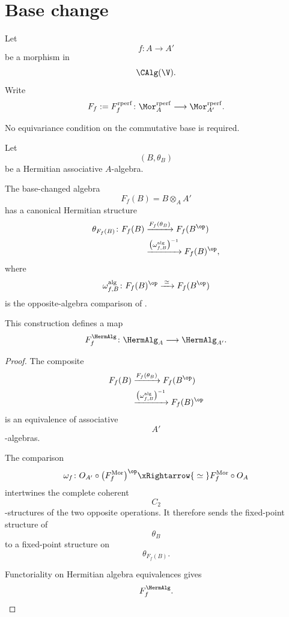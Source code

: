\section{Base change}
\label{sec:equivariant-base-change}

Let
\[
    f
    \colon
    A
    \longrightarrow
    A'
\]
be a morphism in
\[
    \CAlg(\V).
\]
Write
\[
    F_f
    :=
    F_f^{\mathrm{rperf}}
    \colon
    \Mor_A^{\mathrm{rperf}}
    \longrightarrow
    \Mor_{A'}^{\mathrm{rperf}}.
\]

No equivariance condition on the commutative base is required.

\begin{proposition}
\label{prop:base-change-hermitian-algebra}
Let
\[
    (B,\theta_B)
\]
be a Hermitian associative $A$-algebra.

The base-changed algebra
\[
    F_f(B)
    =
    B\otimes_AA'
\]
has a canonical Hermitian structure
\[
\begin{aligned}
    \theta_{F_f(B)}
    \colon
    F_f(B)
    &\xrightarrow{
        F_f(\theta_B)
    }
    F_f(B^{\op})
    \\
    &\xrightarrow{
        \bigl(
            \omega_{f,B}^{\mathrm{alg}}
        \bigr)^{-1}
    }
    F_f(B)^{\op},
\end{aligned}
\]
where
\[
    \omega_{f,B}^{\mathrm{alg}}
    \colon
    F_f(B)^{\op}
    \xrightarrow{\;\simeq\;}
    F_f(B^{\op})
\]
is the opposite-algebra comparison of
.

This construction defines a map
\[
    F_f^{\HermAlg}
    \colon
    \HermAlg_A
    \longrightarrow
    \HermAlg_{A'}.
\]
\end{proposition}

\begin{proof}
The composite
\[
\begin{aligned}
    F_f(B)
    &\xrightarrow{
        F_f(\theta_B)
    }
    F_f(B^{\op})
    \\
    &\xrightarrow{
        \bigl(
            \omega_{f,B}^{\mathrm{alg}}
        \bigr)^{-1}
    }
    F_f(B)^{\op}
\end{aligned}
\]
is an equivalence of associative
\[
    A'
\]
-algebras.

The comparison
\[
    \omega_f
    \colon
    O_{A'}
    \circ
    \bigl(
        F_f^{\mathrm{Mor}}
    \bigr)^{\op}
    \xRightarrow{\;\simeq\;}
    F_f^{\mathrm{Mor}}
    \circ
    O_A
\]
intertwines the complete coherent
\[
    C_2
\]
-structures of the two opposite operations. It therefore sends the
fixed-point structure of
\[
    \theta_B
\]
to a fixed-point structure on
\[
    \theta_{F_f(B)}.
\]

Functoriality on Hermitian algebra equivalences gives
\[
    F_f^{\HermAlg}.
\]
\end{proof}

